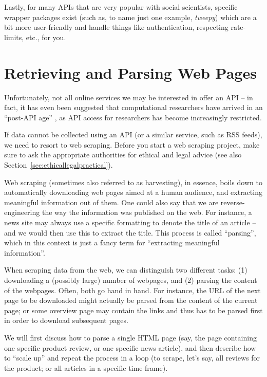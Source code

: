 Lastly, for many APIs that are very popular with social
scientists, specific wrapper packages exist (such as, to name just one example, \emph{tweepy})
which are a bit more user-friendly and handle things like authentication,
respecting rate-limits, etc., for you.


%

\section{Retrieving and Parsing Web Pages}
\label{sec:webpages}

Unfortunately, not all online services we may be interested in offer
an API -- in fact, it has even been suggested that computational
researchers have arrived in an ``post-API age'' \citep{Freelon2018}, as
API access for researchers has become increasingly restricted.

If data cannot be collected using an API (or a similar service, such
as RSS feeds), we need to resort to web scraping. Before you start a
web scraping project, make sure to ask the appropriate  authorities for
ethical and legal advice (see also Section~\ref{sec:ethicallegalpractical}).

Web scraping (sometimes also referred to as harvesting), in essence,
boils down to automatically downloading web pages aimed at a human
audience, and extracting meaningful information out of them. One could
also say that we are reverse-engineering the way the information was
published on the web. For instance, a news site may always use a
specific formatting to denote the title of an article -- and we would
then use this to extract the title. This process is called ``parsing'',
which in this context is just a fancy term for ``extracting meaningful
information''.

When scraping data from the web, we can distinguish two different
tasks: (1) downloading a (possibly large) number of webpages, and (2)
parsing the content of the webpages. Often, both go hand in
hand. For instance, the URL of the next page to be downloaded might
actually be parsed from the content of the current page; or some
overview page may contain the links and thus has to be parsed first in
order to download subsequent pages.

We will first discuss how to parse a single HTML page (say, the page
containing one specific product review, or one specific news article),
and then describe how to ``scale up'' and repeat the process in a
loop (to scrape, let's say, all reviews for the product; or all
articles in a specific time frame).




